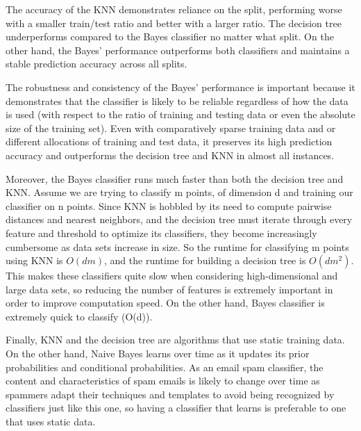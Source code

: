 \documentclass[twoside,11pt]{homework}
\begin{document}
	The accuracy of the KNN demonstrates reliance on the split, performing worse with a smaller train/test ratio and better with a larger ratio. The decision tree underperforms compared to the Bayes classifier no matter what split. On the other hand, the Bayes' performance outperforms both classifiers and maintains a stable prediction accuracy across all splits.

	The robustness and consistency of the Bayes' performance is important because it demonstrates that the classifier is likely to be reliable regardless of how the data is used (with respect to the ratio of training and testing data or even the absolute size of the training set). Even with comparatively sparse training data and or different allocations of training and test data, it preserves its high prediction accuracy and outperforms the decision tree and KNN in almost all instances. 
	
	Moreover, the Bayes classifier runs much faster than both the decision tree and KNN. Assume we are trying to classify m points, of dimension d and training our classifier on n points. Since KNN is hobbled by its need to compute pairwise distances and nearest neighbors, and the decision tree must iterate through every feature and threshold to optimize its classifiers, they become increasingly cumbersome as data sets increase in size. So the runtime for classifying m points using KNN is $O(dm)$, and the runtime for building a decision tree is $O(dm^2)$. This makes these classifiers quite slow when considering high-dimensional and large data sets, so 
	 reducing the number of features is extremely important in order to improve computation speed. On the other hand, Bayes classifier is extremely quick to classify (O(d)). 
	 
	 Finally, KNN and the decision tree are algorithms that use static training data. On the other hand, Naive Bayes learns over time as it updates its prior probabilities and conditional probabilities. As an email spam classifier, the content and characteristics of spam emails is likely to change over time as spammers adapt their techniques and templates to avoid being recognized by classifiers just like this one, so having a classifier that learns is preferable to one that uses static data.
	 
	 
\end{document}
